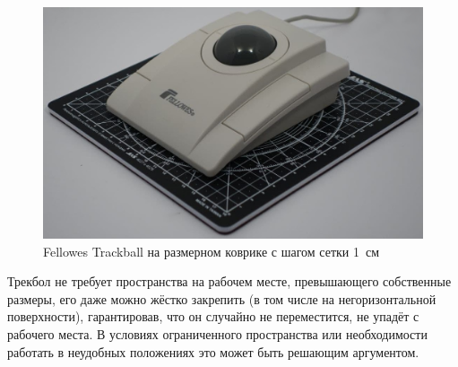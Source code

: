 \documentclass[11pt, a4paper]{article}
\begin{document}
\begin{figure}[h]
    \centering
    \includegraphics[scale=0.25]{1997_fellowes_trackball/fellowsset.jpg}
    \caption{Fellowes Trackball на размерном коврике с шагом сетки 1~см}
    \label{fig:size}
\end{figure}

Трекбол не требует пространства на рабочем месте, превышающего собственные размеры, его даже можно жёстко закрепить (в том числе на негоризонтальной поверхности), гарантировав, что он случайно не переместится, не упадёт с рабочего места. В условиях ограниченного пространства или необходимости работать в неудобных положениях это может быть решающим аргументом.
\end{document}
